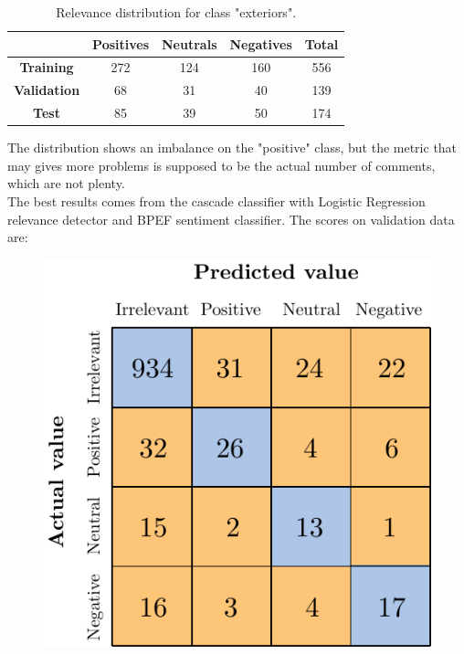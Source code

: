 \begin{table}[H]
	\centering
	\begin{tabular}{ | c  c  c c | c | } 
		\hline
		& \textbf{Positives} & \textbf{Neutrals} & \textbf{Negatives} & \textbf{Total} \\
		\hline
		\textbf{Training} & 272 & 124 & 160 & 556 \\ 
		\hline
		\textbf{Validation} & 68 & 31 & 40 & 139 \\ 
		\hline
		\textbf{Test} & 85 & 39 & 50 & 174 \\
		\hline
	\end{tabular}
	\caption{Relevance distribution for class "exteriors".}
	\label{table:snt-dist-exteriors}
\end{table}

The distribution shows an imbalance on the "positive" class, but the metric that may gives more problems is supposed to be the actual number of comments, which are not plenty.\\
The best results comes from the cascade classifier with Logistic Regression relevance detector and BPEF sentiment classifier. The scores on validation data are:

\begin{figure}[H]
	\centering
	\includegraphics[scale=1]{figures/conf_matrices/ita_exteriors/ita_cascade_exteriors_bpef_val.pdf}
	\label{fig:ita_cascade_exteriors_bpef_val}
\end{figure}

